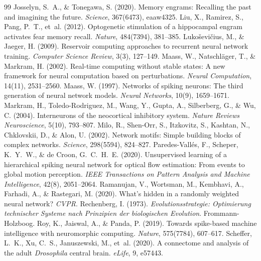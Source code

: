 \documentclass[10pt]{article}
\begin{document}
\begin{thebibliography}{99}
Josselyn, S.~A., \& Tonegawa, S. (2020). Memory engrams: Recalling the past and imagining the future. \textit{Science}, 367(6473), eaaw4325.
Liu, X., Ramirez, S., Pang, P.~T., et~al. (2012). Optogenetic stimulation of a hippocampal engram activates fear memory recall. \textit{Nature}, 484(7394), 381--385.
Luko\v{s}evi\v{c}ius, M., \& Jaeger, H. (2009). Reservoir computing approaches to recurrent neural network training. \textit{Computer Science Review}, 3(3), 127--149.
Maass, W., Natschl\"{a}ger, T., \& Markram, H. (2002). Real-time computing without stable states: A new framework for neural computation based on perturbations. \textit{Neural Computation}, 14(11), 2531--2560.
Maass, W. (1997). Networks of spiking neurons: The third generation of neural network models. \textit{Neural Networks}, 10(9), 1659--1671.
Markram, H., Toledo-Rodriguez, M., Wang, Y., Gupta, A., Silberberg, G., \& Wu, C. (2004). Interneurons of the neocortical inhibitory system. \textit{Nature Reviews Neuroscience}, 5(10), 793--807.
Milo, R., Shen-Orr, S., Itzkovitz, S., Kashtan, N., Chklovskii, D., \& Alon, U. (2002). Network motifs: Simple building blocks of complex networks. \textit{Science}, 298(5594), 824--827.
Paredes-Vall\'{e}s, F., Scheper, K.~Y.~W., \& de Croon, G.~C.~H.~E. (2020). Unsupervised learning of a hierarchical spiking neural network for optical flow estimation: From events to global motion perception. \textit{IEEE Transactions on Pattern Analysis and Machine Intelligence}, 42(8), 2051--2064.
Ramanujan, V., Wortsman, M., Kembhavi, A., Farhadi, A., \& Rastegari, M. (2020). What's hidden in a randomly weighted neural network? \textit{CVPR}.
Rechenberg, I. (1973). \textit{Evolutionsstrategie: Optimierung technischer Systeme nach Prinzipien der biologischen Evolution}. Frommann-Holzboog.
Roy, K., Jaiswal, A., \& Panda, P. (2019). Towards spike-based machine intelligence with neuromorphic computing. \textit{Nature}, 575(7784), 607--617.
Scheffer, L.~K., Xu, C.~S., Januszewski, M., et~al. (2020). A connectome and analysis of the adult \textit{Drosophila} central brain. \textit{eLife}, 9, e57443.

\end{thebibliography}
\end{document}
